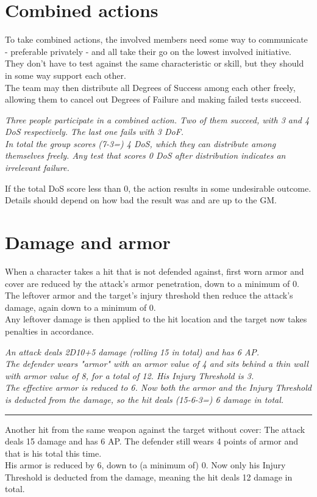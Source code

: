 \section{Combined actions}
\label{combinedaction}
To take combined actions, the involved members need some way to communicate - preferable privately - and all take their go on the lowest involved initiative. They don't have to test against the same characteristic or skill, but they should in some way support each other.\\
The team may then distribute all Degrees of Success among each other freely, allowing them to cancel out Degrees of Failure and making failed tests succeed.
\begin{exampleblock}
	\itshape
	Three people participate in a combined action. Two of them succeed, with 3 and 4 DoS respectively. The last one fails with 3 DoF.\\
	In total the group scores (7-3=) 4 DoS,
		which they can distribute among themselves freely.
	Any test that scores 0 DoS after distribution indicates an irrelevant failure.
\end{exampleblock}
If the total DoS score less than 0,
	the action results in some undesirable outcome.
Details should depend on how bad the result was
	and are up to the GM.
\section{Damage and armor}
When a character takes a hit that is not defended against, first worn armor and cover are reduced by the attack's armor penetration, down to a minimum of 0. \\
The leftover armor and the target’s injury threshold then reduce the attack’s damage, again down to a minimum of 0. \\
Any leftover damage is then applied to the hit location
	and the target now takes penalties in accordance.
\begin{exampleblock}
	\itshape
	An attack deals 2D10+5 damage (rolling 15 in total) and has 6 AP.\\
	The defender wears "armor" with an armor value of 4 and sits behind a thin wall with armor value of 8, for a total of 12. His Injury Threshold is 3.\\
	The effective armor is reduced to 6. Now both the armor and the Injury Threshold is deducted from the damage, so the hit deals (15-6-3=) 6 damage in total.
	\par
	\vspace{2mm}
	\hrule
	\vspace{2mm}
	Another hit from the same weapon against the target without cover:
	The attack deals 15 damage and has 6 AP.
	The defender still wears 4 points of armor and that is his total this time.
	\\%
	His armor is reduced by 6, down to (a minimum of) 0.
	Now only his Injury Threshold is deducted from the damage,
		meaning the hit deals 12 damage in total.
\end{exampleblock}
